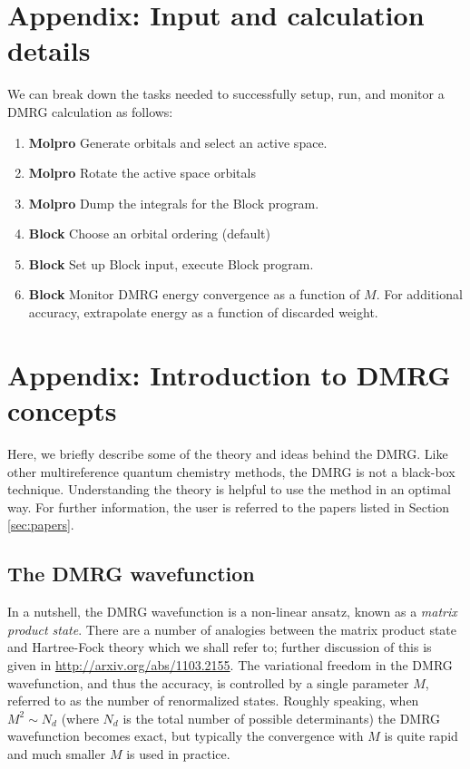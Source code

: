 \documentclass[letterpaper,12pt,aps, pra]{revtex4-1}
\begin{document}
\section{Appendix: Input and calculation details}
\label{sec:appDetails}
We can break down the tasks needed to successfully setup, run, and monitor a DMRG calculation as follows:
\begin{enumerate}
\item {\bf Molpro} Generate orbitals and select an active space. 
\item {\bf Molpro} Rotate the active space orbitals
\item {\bf Molpro} Dump the integrals for the Block program.
\item {\bf Block} Choose an orbital ordering (default)
\item {\bf Block} Set up Block input, execute Block program.
\item {\bf Block} Monitor DMRG energy convergence as a function of $M$. For additional accuracy, extrapolate energy as a function of discarded weight. 
\end{enumerate}



\section{Appendix: Introduction to DMRG concepts}\label{sec:appendix1}

Here, we briefly describe some of the theory and ideas behind the DMRG. 
Like other multireference quantum chemistry methods, the DMRG
is not a black-box technique. Understanding the theory is helpful
to use the method in an optimal way. For further information, the
 user is referred to the papers listed in Section \ref{sec:papers}.

\subsection{The DMRG wavefunction}

In a nutshell, the DMRG wavefunction is a non-linear ansatz, known as a {\it matrix product state}.
There are a number of analogies between the matrix product state and Hartree-Fock theory which
we shall refer to; further discussion of this is given in \url{http://arxiv.org/abs/1103.2155}.
 The variational freedom in the DMRG wavefunction, and thus the accuracy, is controlled by a single parameter $M$, referred
to as the number of renormalized states.
Roughly speaking, when $M^2 \sim N_d$ (where $N_d$ is the total number
of possible determinants) the DMRG wavefunction becomes exact, but typically the convergence with $M$
is quite rapid and much smaller $M$ is used in practice. 
\end{document}
